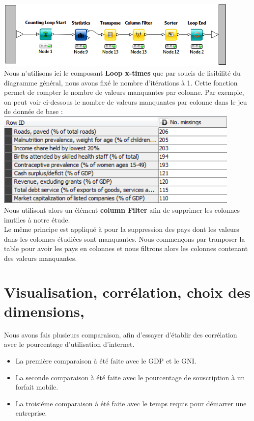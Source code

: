 	\includegraphics[width=0.9\textwidth]{Loop.png}\\
	Nous n'utilisons ici le composant \textbf{Loop x-times} que par soucis de lisibilité du diagramme général, nous avons fixé le nombre d'itérations à 1.
	Cette fonction permet de compter le nombre de valeurs manquantes par colonne. Par exemple, on peut voir ci-dessous le nombre de valeurs manquantes par colonne dans le jeu de donnée de base : \\
	\includegraphics[width=0.9\textwidth]{ColumnMissing.png}\\
	Nous utilisont alors un élément \textbf{column Filter} afin de supprimer les colonnes inutiles à notre étude.\\
	Le même principe est appliqué à pour la suppression des pays dont les valeurs dans les colonnes étudiées sont manquantes. Nous commençons par tranposer la table pour avoir les pays en colonnes et nous filtrons alors les colonnes contenant des valeurs manquantes.
		
		
\section{Visualisation, corrélation, choix des dimensions, }

    Nous avons fais plusieurs comparaison, afin d'essayer d'établir des corrélation avec le pourcentage d'utilisation d'internet.
    \begin{itemize}
        \item La première comparaison à été faite avec le GDP et le GNI.
        \item La seconde comparaison à été faite avec le pourcentage de souscription à un forfait mobile.
        \item La troisiéme comparaison à été faite avec le temps requis pour démarrer une entreprise.
    \end{itemize}

